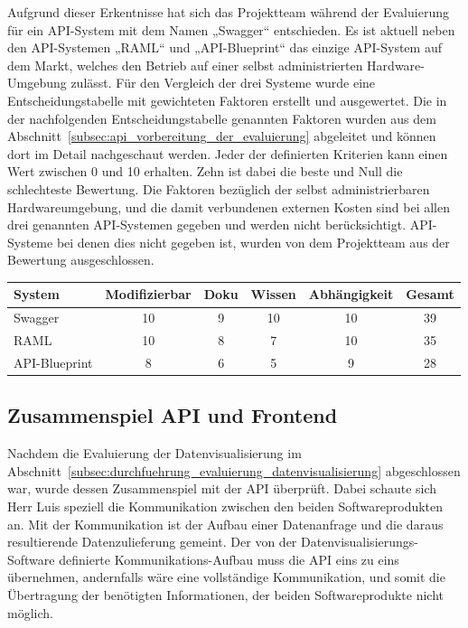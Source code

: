 Aufgrund dieser Erkentnisse hat sich das Projektteam während der Evaluierung
für ein \gls{API}\hyp{}System mit dem Namen „Swagger“ entschieden. Es ist
aktuell neben den \gls{API}\hyp{}Systemen „RAML“ und „API\hyp{}Blueprint“ das
einzige \gls{API}\hyp{}System auf dem Markt, welches den Betrieb auf einer
selbst administrierten Hardware\hyp{}Umgebung zulässt. Für den Vergleich der
drei Systeme wurde eine Entscheidungstabelle mit gewichteten Faktoren erstellt
und ausgewertet. Die in der nachfolgenden Entscheidungstabelle genannten
Faktoren wurden aus dem Abschnitt~\ref{subsec:api_vorbereitung_der_evaluierung}
abgeleitet und können dort im Detail nachgeschaut werden. Jeder der definierten
Kriterien kann einen Wert zwischen 0 und 10 erhalten. Zehn ist dabei die beste
und Null die schlechteste Bewertung. Die Faktoren bezüglich der selbst
administrierbaren Hardwareumgebung, und die damit verbundenen externen Kosten
sind bei allen drei genannten \gls{API}\hyp{}Systemen gegeben und werden nicht
berücksichtigt. \gls{API}\hyp{}Systeme bei denen dies nicht gegeben ist, wurden
von dem Projektteam aus der Bewertung ausgeschlossen.

\begin{center}
\begin{tabular}{lccccc}
  \toprule
  System          & Modifizierbar & Doku  & Wissen  & Abhängigkeit  & Gesamt \\
  \midrule
  Swagger             & 10            & 9     & 10      & 10            & 39 \\
  RAML                & 10            & 8     & 7       & 10            & 35 \\
  API\hyp{}Blueprint  & 8             & 6     & 5       & 9             & 28 \\
  \bottomrule
\end{tabular}
\end{center}
\nl%

\subsection{Zusammenspiel API und Frontend}
\label{subsec:zusammenspiel_api_frontend}
Nachdem die Evaluierung der Datenvisualisierung im
Abschnitt~\ref{subsec:durchfuehrung_evaluierung_datenvisualisierung}
abgeschlossen war, wurde dessen Zusammenspiel mit der \gls{API} überprüft.
Dabei schaute sich Herr Luis speziell die Kommunikation zwischen den beiden
Softwareprodukten an. Mit der Kommunikation ist der Aufbau einer Datenanfrage
und die daraus resultierende Datenzulieferung gemeint. Der von der
Datenvisualisierungs\hyp{}Software definierte Kommunikations\hyp{}Aufbau muss
die \gls{API} eins zu eins übernehmen, andernfalls wäre eine vollständige
Kommunikation, und somit die Übertragung der benötigten Informationen, der
beiden Softwareprodukte nicht möglich.

